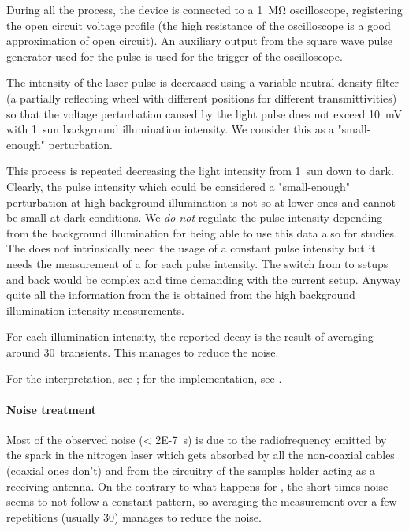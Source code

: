 During all the process, the device is connected to a \SI{1}{\Mohm} oscilloscope, registering the open circuit voltage profile (the high resistance of the oscilloscope is a good approximation of open circuit). An auxiliary output from the square wave pulse generator used for the pulse is used for the trigger of the oscilloscope.

The intensity of the laser pulse is decreased using a variable neutral density filter (a partially reflecting wheel with different positions for different transmittivities) so that the voltage perturbation caused by the light pulse does not exceed \SI{10}{\mV} with 1~sun background illumination intensity. We consider this as a "small-enough" perturbation.

This process is repeated decreasing the light intensity from 1~sun down to dark. Clearly, the pulse intensity which could be considered a "small-enough" perturbation at high background illumination is not so at lower ones and cannot be small at dark conditions. We \emph{do not} regulate the pulse intensity depending from the background illumination for being able to use this data also for  studies. The  does not intrinsically need the usage of a constant pulse intensity but it needs the measurement of a  for each pulse intensity. The switch from  to  setups and back would be complex and time demanding with the current setup. Anyway quite all the information from the  is obtained from the high background illumination intensity measurements.

For each illumination intensity, the reported decay is the result of averaging around 30~transients. This manages to reduce the noise.

For the interpretation, see ; for the implementation, see .


\paragraph{Noise treatment}\label{tpv_robust}

Most of the observed noise (\SI{< 2E-7}{\s}) is due to the radiofrequency emitted by the spark in the nitrogen laser which gets absorbed by all the non-coaxial cables (coaxial ones don't) and from the circuitry of the samples holder acting as a receiving antenna. On the contrary to what happens for , the short times noise seems to not follow a constant pattern, so averaging the measurement over a few repetitions (usually 30) manages to reduce the noise.

